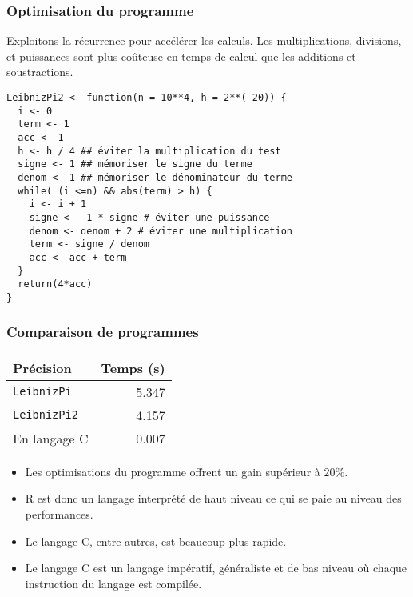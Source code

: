 \documentclass[10pt]{beamer}
\begin{document}
\begin{frame}[fragile]
  \frametitle{Optimisation du programme}
  \begin{alertblock}{Exploitons la récurrence pour accélérer les calculs.}
    \alert{Les multiplications, divisions, et puissances sont plus coûteuse en temps de calcul que les additions et soustractions.}
  \end{alertblock}

  \begin{lstlisting}
LeibnizPi2 <- function(n = 10**4, h = 2**(-20)) {
  i <- 0
  term <- 1
  acc <- 1
  h <- h / 4 ## éviter la multiplication du test
  signe <- 1 ## mémoriser le signe du terme
  denom <- 1 ## mémoriser le dénominateur du terme
  while( (i <=n) && abs(term) > h) {
    i <- i + 1
    signe <- -1 * signe # éviter une puissance
    denom <- denom + 2 # éviter une multiplication
    term <- signe / denom
    acc <- acc + term
  }
  return(4*acc)
}

  \end{lstlisting}
\end{frame}

\begin{frame}
  \frametitle{Comparaison de programmes}


    \begin{table}[h]
    \centering
    \begin{tabular}{lr}
      \toprule
      Précision           & Temps (s) \\
      \midrule
      \texttt{LeibnizPi}  & 5.347     \\
      \texttt{LeibnizPi2} & 4.157     \\
      En langage C        & 0.007     \\
             \bottomrule
    \end{tabular}
  \end{table}

  \begin{itemize}
  \item Les optimisations du programme offrent un gain supérieur à $20\%$.
  \item R est donc un langage interprété de haut niveau ce qui se paie au niveau des performances.
  \item Le langage C, entre autres, est beaucoup plus rapide.
  \item Le langage C est un langage impératif, généraliste et de bas niveau où chaque instruction du langage est compilée.
  \end{itemize}

\end{frame}
\end{document}
